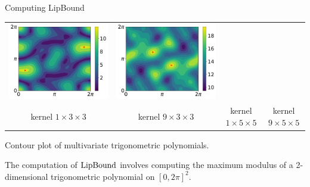 \begin{frame}{Computing LipBound}
\begin{minipage}{\textwidth}
\begin{tabular}{cccc}
      \includegraphics[scale=0.15]{images/contour_poly_200_1_1_5.pdf} & 
      \includegraphics[scale=0.15]{images/contour_poly_200_1_9_5.pdf} \\
      \footnotesize{kernel $1\times3\times3$} &
      \footnotesize{kernel $9\times3\times3$} &
      \footnotesize{kernel $1\times5\times5$} &
      \footnotesize{kernel $9\times5\times5$}
    \end{tabular}

    \vspace{0.2cm}
    \footnotesize{Contour plot of multivariate trigonometric polynomials.}
  \end{minipage}

  \vspace{0.3cm}
  The computation of $\operatorname*{LipBound}$ involves computing the maximum modulus of a 2-dimensional trigonometric polynomial on $[ 0, 2\pi]^2$.


\end{frame}
